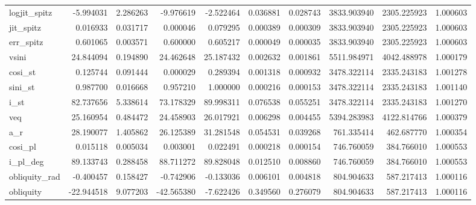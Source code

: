 \begin{tabular}{lrrrrrrrrr}
logjit\_spitz  &   -5.994031 &   2.286263 &   -9.976619 &   -2.522464 &   0.036881 &  0.028743 &  3833.903940 &  2305.225923 &  1.000603 \\
jit\_spitz     &    0.016933 &   0.031717 &    0.000046 &    0.079295 &   0.000389 &  0.000309 &  3833.903940 &  2305.225923 &  1.000603 \\
err\_spitz     &    0.601065 &   0.003571 &    0.600000 &    0.605217 &   0.000049 &  0.000035 &  3833.903940 &  2305.225923 &  1.000603 \\
vsini         &   24.844094 &   0.194890 &   24.462648 &   25.187432 &   0.002632 &  0.001861 &  5511.984971 &  4042.488978 &  1.000179 \\
cosi\_st       &    0.125744 &   0.091444 &    0.000029 &    0.289394 &   0.001318 &  0.000932 &  3478.322114 &  2335.243183 &  1.001278 \\
sini\_st       &    0.987700 &   0.016668 &    0.957210 &    1.000000 &   0.000216 &  0.000153 &  3478.322114 &  2335.243183 &  1.001140 \\
i\_st          &   82.737656 &   5.338614 &   73.178329 &   89.998311 &   0.076538 &  0.055251 &  3478.322114 &  2335.243183 &  1.001270 \\
veq           &   25.160954 &   0.484472 &   24.458903 &   26.017921 &   0.006298 &  0.004455 &  5394.283983 &  4122.814766 &  1.000379 \\
a\_r           &   28.190077 &   1.405862 &   26.125389 &   31.281548 &   0.054531 &  0.039268 &   761.335414 &   462.687770 &  1.000354 \\
cosi\_pl       &    0.015118 &   0.005034 &    0.003001 &    0.022491 &   0.000218 &  0.000154 &   746.760059 &   384.766010 &  1.000553 \\
i\_pl\_deg      &   89.133743 &   0.288458 &   88.711272 &   89.828048 &   0.012510 &  0.008860 &   746.760059 &   384.766010 &  1.000553 \\
obliquity\_rad &   -0.400457 &   0.158427 &   -0.742906 &   -0.133036 &   0.006101 &  0.004818 &   804.904633 &   587.217413 &  1.000116 \\
obliquity     &  -22.944518 &   9.077203 &  -42.565380 &   -7.622426 &   0.349560 &  0.276079 &   804.904633 &   587.217413 &  1.000116 \\
\bottomrule
\end{tabular}
